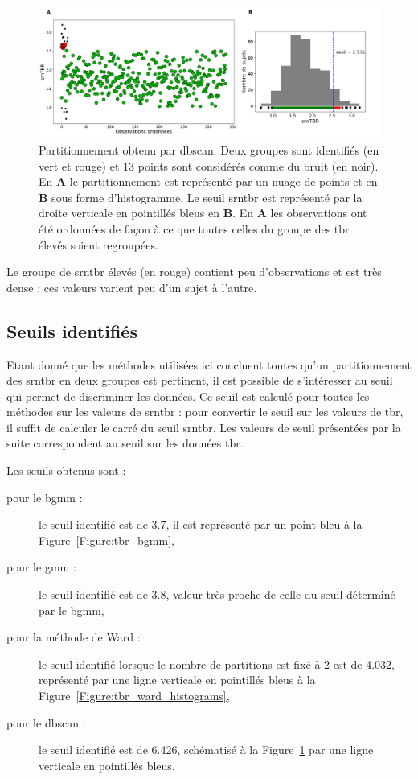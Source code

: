 \begin{figure}[h!]
  \centering
	\includegraphics[width=1.0\linewidth]{figures/chapter-4/tbr-dbscan-clustering-plot} 
  \caption{Partitionnement obtenu par \gls{dbscan}. Deux groupes sont identifiés (en vert et rouge) et 13 points sont considérés comme du bruit (en noir).
	En \textbf{A} le partitionnement est représenté par un nuage de points et en \textbf{B} sous forme d'histogramme. Le seuil \gls{srntbr} est représenté par 
	la droite verticale en pointillés bleus en \textbf{B}. En \textbf{A} les observations ont été ordonnées de façon à ce que toutes celles du groupe des \gls{tbr} élevés 
	soient regroupées.}
  \label{Figure:tbr_dbscan_clustering_plot}
\end{figure}

Le groupe de \gls{srntbr} élevés (en rouge) contient peu d'observations et est très dense : ces valeurs varient peu d'un sujet à l'autre.


\subsection{Seuils identifiés}
Etant donné que les méthodes utilisées ici concluent toutes qu'un partitionnement des \gls{srntbr} en deux groupes est pertinent, il est possible de s'intéresser
au seuil qui permet de discriminer les données. Ce seuil est calculé pour toutes les méthodes sur les valeurs de \gls{srntbr} : pour convertir le seuil sur 
les valeurs de \gls {tbr}, il suffit de calculer le carré du seuil \gls{srntbr}. Les valeurs de seuil présentées par la suite correspondent au seuil
sur les données \gls{tbr}.

Les seuils obtenus sont : 
\begin{description}
\item[pour le \gls{bgmm} : ] le seuil identifié est de 3.7, il est représenté par un point bleu à la Figure~\ref{Figure:tbr_bgmm},
\item[pour le \gls{gmm} : ] le seuil identifié est de 3.8, valeur très proche de celle du seuil déterminé par le \gls{bgmm},
\item[pour la méthode de Ward : ] le seuil identifié lorsque le nombre de partitions est fixé à 2 est de 4.032, représenté
par une ligne verticale en pointillés bleus à la Figure~\ref{Figure:tbr_ward_histograms},
\item[pour le \gls{dbscan} : ] le seuil identifié est de 6.426, schématisé à la Figure~\ref{Figure:tbr_dbscan_clustering_plot} par une ligne
verticale en pointillés bleus. 
\end{description}

